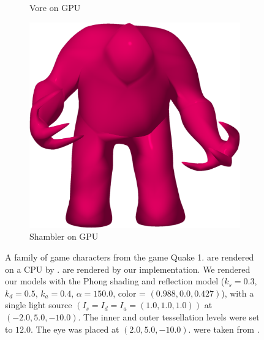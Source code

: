 \begin{figure}
\begin{subfigure}[b]{0.2\textwidth}
		\caption{Vore on GPU}
		\label{fig:results:cpugpu:gpuVore}
	\end{subfigure}	
	\hspace{0.1\textwidth}
	\begin{subfigure}[b]{0.2\textwidth}
		\centering
		\includegraphics[width=\textwidth]{content/img/results/cpugpu/shamblerGPU.png}
		\caption{Shambler on GPU}
		\label{fig:results:cpugpu:gpuShambler}
	\end{subfigure}			
	\caption{A family of game characters from the game Quake 1.  are rendered on a CPU by \citeauthor{vlachos2001curved}.  are rendered by our implementation. We rendered our models with the Phong shading and reflection model ($k_s = 0.3$, $k_d = 0.5$, $k_a = 0.4$, $\alpha = 150.0$, color = $(0.988, 0.0, 0.427)$), with a single light source $\left(I_s = I_d = I_a = (1.0, 1.0, 1.0)\right)$ at $(-2.0, 5.0, -10.0)$. The inner and outer tessellation levels were set to $12.0$. The eye was placed at $(2.0, 5.0, -10.0)$.
% 
	 were taken from \textcite{vlachos2001curved}.}
	\label{fig:results:cpugpu}
\end{figure}